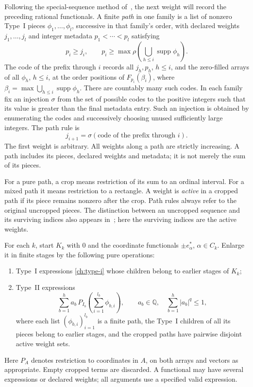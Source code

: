 Following the special-sequence method of~\cite{GowersMaurey1993},
the next weight will record the preceding rational functionals.
A finite \emph{path} in one family is a list of nonzero Type~I pieces
$\phi_1,\ldots,\phi_l$, successive in that family's order, with declared
weights $j_1,\ldots,j_l$ and integer metadata $p_1<\cdots<p_l$ satisfying
\[
 p_i\ge j_i,\qquad
 p_i\ge\max\rho\left(\bigcup_{h\le i}\operatorname{supp}\phi_h\right).
\]
The code of the prefix through $i$ records all $j_h,p_h$, $h\le i$, and
the zero-filled arrays of all $\phi_h$, $h\le i$, at the order positions
of $F_{p_i}(\beta_i)$, where
$\beta_i=\max\bigcup_{h\le i}\operatorname{supp}\phi_h$.
There are countably many such codes.  In each family fix an injection
$\sigma$ from the set of possible codes to the positive integers such
that its value is greater than the final metadata entry.  Such an
injection is obtained by enumerating the codes and successively choosing
unused sufficiently large integers.  The path rule is
\begin{equation}
 j_{i+1}=\sigma(\text{code of the prefix through }i).
 \label{ch:path-rule}
\end{equation}
The first weight is arbitrary.  All weights along a path are strictly
increasing.  A path includes its pieces, declared weights and metadata;
it is not merely the sum of its pieces.

For a pure path, a crop means restriction of its sum to an ordinal
interval.  For a mixed path it means restriction to a rectangle.  A
weight is \emph{active} in a cropped path if its piece remains nonzero
after the crop.  Path rules always refer to the original uncropped
pieces. The distinction between an uncropped sequence and its surviving
indices also appears in~\cite[Section~3]{ArgyrosArvanitakisTolias2006};
here the surviving indices are the active weights.

For each $k$, start $K_k$ with $0$ and the coordinate functionals
$\pm e_\alpha^*$, $\alpha\in C_k$.  Enlarge it in finite stages by the
following pure operations:
\begin{enumerate}
 \item Type~I expressions \eqref{ch:type-i} whose children belong to
 earlier stages of $K_k$;
 \item Type~II expressions
 \begin{equation}
  \sum_{b=1}^{h}a_b\,P_{I_b}
    \left(\sum_{i=1}^{l_b}\phi_{b,i}\right),
  \qquad a_b\in\mathbb Q,\quad \sum_{b=1}^{h}|a_b|^q\le1,
  \label{ch:type-ii}
 \end{equation}
 where each list $(\phi_{b,i})_{i=1}^{l_b}$ is a finite path, the
 Type~I children of all its pieces belong to earlier stages, and the
 cropped paths have pairwise disjoint active weight sets.
\end{enumerate}
Here $P_A$ denotes restriction to coordinates in $A$, on both arrays and
vectors as appropriate.  Empty cropped terms are discarded.  A
functional may have several expressions or declared weights; all
arguments use a specified valid expression.

